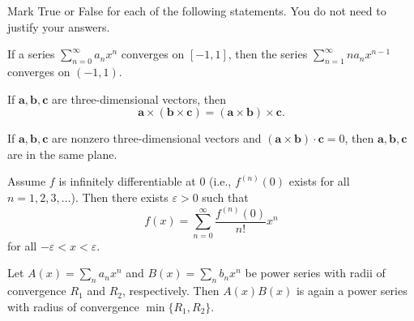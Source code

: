 \begin{problem}
Mark True or False for each of the following statements. You do not need to justify your answers.
\begin{problemchoices}
\item If a series $\displaystyle\sum_{n=0}^{\infty}a_nx^n$ converges on $[-1,1]$, then the series $\displaystyle\sum_{n=1}^{\infty}na_nx^{n-1}$ converges on $(-1,1)$.
\item If $\mathbf a,\mathbf b,\mathbf c$ are three-dimensional vectors, then
\[
\mathbf a\times(\mathbf b\times\mathbf c)=(\mathbf a\times\mathbf b)\times\mathbf c.
\]
\item If $\mathbf a,\mathbf b,\mathbf c$ are nonzero three-dimensional vectors and $(\mathbf a\times\mathbf b)\cdot\mathbf c=0$, then $\mathbf a,\mathbf b,\mathbf c$ are in the same plane.
\item Assume $f$ is infinitely differentiable at $0$ (i.e., $f^{(n)}(0)$ exists for all $n=1,2,3,\ldots$). Then there exists $\varepsilon>0$ such that
\[
f(x)=\sum_{n=0}^{\infty}\frac{f^{(n)}(0)}{n!}x^n
\]
for all $-\varepsilon<x<\varepsilon$.
\item Let $A(x)=\displaystyle\sum_n a_nx^n$ and $B(x)=\displaystyle\sum_n b_nx^n$ be power series with radii of convergence $R_1$ and $R_2$, respectively. Then $A(x)B(x)$ is again a power series with radius of convergence $\min\{R_1,R_2\}$.
\end{problemchoices}
\end{problem}

